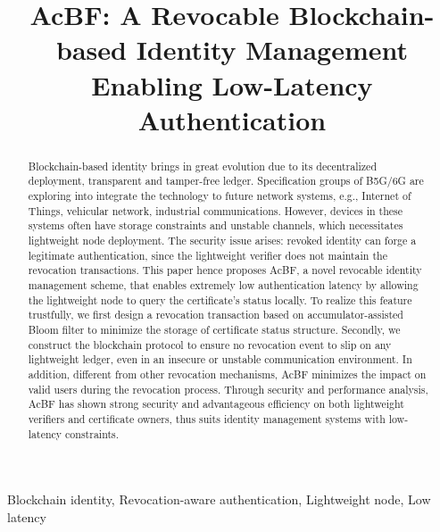 \documentclass[conference]{IEEEtran}
\title{AcBF: A Revocable Blockchain-based Identity Management Enabling Low-Latency Authentication}
\begin{document}
\maketitle

\begin{abstract}
	Blockchain-based identity brings in great evolution due to its decentralized deployment, transparent and tamper-free ledger. Specification groups of B5G/6G are exploring into integrate the technology to future network systems, e.g., Internet of Things, vehicular network, industrial communications. However, devices in these systems often have storage constraints and unstable channels,  which necessitates lightweight node deployment. The security issue arises: revoked identity can forge a legitimate authentication, since the lightweight verifier does not maintain the revocation transactions. 
	This paper hence proposes AcBF, a novel revocable identity management scheme, that enables extremely low authentication latency by allowing the lightweight node to query the certificate's status locally. To realize this feature trustfully, we first design a revocation transaction based on accumulator-assisted Bloom filter to minimize the storage of certificate status structure. Secondly, we construct the blockchain protocol to ensure no revocation event to slip on any lightweight ledger, even in an insecure or unstable communication environment.  
	In addition, different from other revocation mechanisms, AcBF minimizes the impact on valid users during the revocation process. %
	Through security and performance analysis, AcBF has shown strong security and advantageous efficiency on both lightweight verifiers and certificate owners, thus suits identity management systems with low-latency constraints.
\end{abstract}
\begin{IEEEkeywords}
    Blockchain identity, Revocation-aware authentication, Lightweight node, Low latency
\end{IEEEkeywords}
\end{document}
